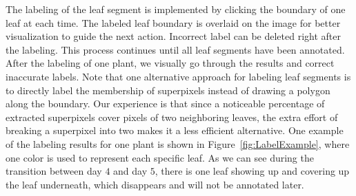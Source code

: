 The labeling of the leaf segment is implemented by clicking the boundary of one leaf at each time.
The labeled leaf boundary is overlaid on the image for better visualization to guide the next action.
Incorrect label can be deleted right after the labeling.
This process continues until all leaf segments have been annotated.
After the labeling of one plant, we visually go through the results and correct inaccurate labels.
Note that one alternative approach for labeling leaf segments is to directly label the membership of superpixels instead of drawing a polygon along the boundary.
Our experience is that since a noticeable percentage of extracted superpixels cover pixels of two neighboring leaves, the extra effort of breaking a superpixel into two makes it a less efficient alternative.
One example of the labeling results for one plant is shown in Figure~\ref{fig:LabelExample}, where one color is used to represent each specific leaf.
As we can see during the transition between day $4$ and day $5$, there is one leaf showing up and covering up the leaf underneath, which disappears and will not be annotated later.



